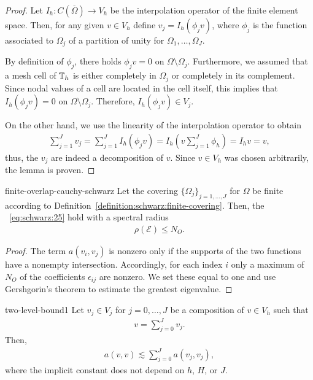 \begin{proof}
  Let $I_h: C(\overline\Omega) \to V_h$ be the interpolation operator
  of the finite element space. Then, for any given $v\in V_h$ define
  $v_j = I_h(\phi_j v)$, where $\phi_j$ is the function associated to
  $\Omega_j$ of a partition of unity for $\Omega_1,\dots,\Omega_J$.
  
  By definition of $\phi_j$, there holds $\phi_j v = 0$ on
  $\Omega\setminus\Omega_j$. Furthermore, we assumed that a mesh cell
  of $\mathbb T_h$ is either completely in $\Omega_j$ or completely in its
  complement. Since nodal values of a cell are located in the cell
  itself, this implies that $I_h (\phi_j v) = 0$ on
  $\Omega\setminus\Omega_j$. Therefore, $I_h (\phi_j v) \in V_j$.
  
  On the other hand, we use the linearity of the interpolation
  operator to obtain
  \begin{gather*}
    \sum_{j=1}^J v_j = \sum_{j=1}^J I_h(\phi_j v)
    = I_h\left(v\sum_{j=1}^J \phi_h\right)
    = I_h v = v,
  \end{gather*}
  thus, the $v_j$ are indeed a decomposition of $v$. Since $v\in V_h$
  was chosen arbitrarily, the lemma is proven.
\end{proof}

\begin{Lemma}{finite-overlap-cauchy-schwarz}
  \label{lemma:schwarz:8}
  Let the covering $\{\Omega_j\}_{j=1,\dots,J}$ for $\Omega$ be finite
  according to
  Definition~\ref{definition:schwarz:finite-covering}. Then, the
  ~\eqref{eq:schwarz:25} hold
  with a spectral radius
  \begin{gather}
    \label{eq:schwarz:26}
    \rho(\mathcal E) \le N_O.
  \end{gather}
\end{Lemma}

\begin{proof}
  The term $a(v_i, v_j)$ is nonzero only if the supports of the two
  functions have a nonempty intersection. Accordingly, for each index
  $i$ only a maximum of $N_O$ of the coefficients $\epsilon_{ij}$ are
  nonzero. We set these equal to one and use Gershgorin's theorem to
  estimate the greatest eigenvalue.
\end{proof}

\begin{Lemma}{two-level-bound1}
  \label{lemma:schwarz:6}
  Let $v_j\in V_j$ for $j=0,\dots,J$ be a composition of $v\in V_h$
  such that
  \begin{gather*}
    v=\sum_{j=0}^J v_j.
  \end{gather*}
  Then,
  \begin{gather}
    \label{eq:schwarz:12}
    a(v,v) \lesssim \sum_{j=0}^J a(v_j, v_j),
  \end{gather}
  where the implicit constant does not depend on $h$, $H$, or $J$.
\end{Lemma}


